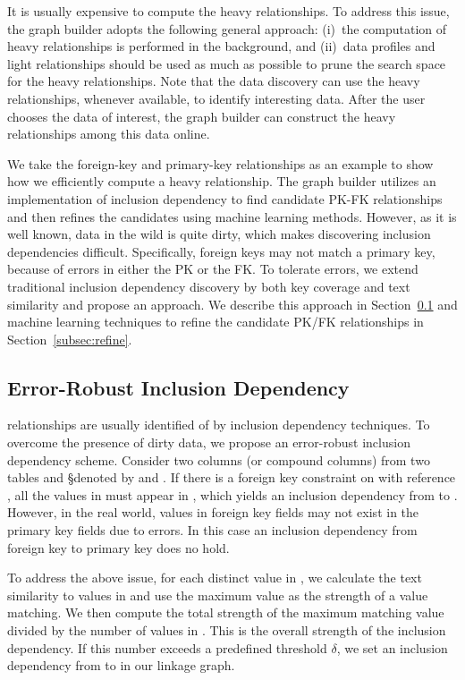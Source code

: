 It is usually expensive to compute the heavy relationships. To address this
issue, the graph builder adopts the following general approach: (i)~the
computation of heavy relationships is performed in the background, and (ii)~data
profiles and light relationships should be used as much as possible to prune the
search space for the heavy relationships. Note that the data discovery can use the heavy relationships, whenever available, to identify interesting data. After the user chooses the data of
interest, the graph builder can construct the heavy relationships among this
data online.

We take the foreign-key and primary-key relationships as an example to show how
we efficiently compute a heavy relationship. The graph builder utilizes an
implementation of inclusion dependency to find candidate PK-FK relationships and
then refines the candidates using machine learning methods. However,
as it is well known, data in the wild is quite dirty, which makes discovering
inclusion dependencies difficult. Specifically, foreign keys may not match a
primary key, because of errors in either the PK or the FK. To tolerate errors,
we extend traditional inclusion dependency discovery by both key coverage and
text similarity and propose an \emph{\eind} approach. 
We describe this approach in Section~\ref{subsec:eind} and machine learning
techniques to refine the candidate PK/FK relationships in Section~\ref{subsec:refine}.

\subsection{Error-Robust Inclusion Dependency}\label{subsec:eind}

\Pkfk relationships are usually identified of by inclusion
dependency techniques. To overcome the presence of dirty data, we propose an
error-robust inclusion dependency scheme.
Consider two columns (or compound columns) from two tables \R and \S denoted by
\RX and \SY. If there is a foreign key constraint on \RX with reference \SY, all
the values in \RX must appear in \SY, which yields an inclusion dependency from
\RX to \SY. However, in the real world, values in foreign key fields may not
exist in the primary key fields due to errors.  In this case an inclusion
dependency from foreign key to primary key does no hold.

To address the above issue, for each distinct value in \RX, we calculate the
text similarity to values in \SY and use the maximum value as the strength of a
value matching. We then compute the total strength of the maximum matching value
divided by the number of values in \RX. This is the overall strength of the
inclusion dependency.  If this number exceeds a predefined threshold $\delta$,
we set an inclusion dependency from \RX to \SY in our linkage graph.


